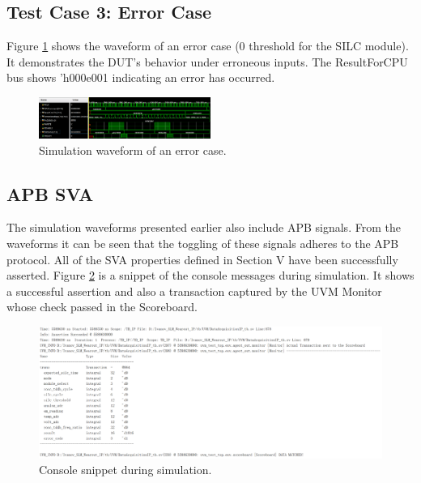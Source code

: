 \documentclass[conference]{IEEEtran}
\begin{document}
\subsection{Test Case 3: Error Case}
Figure \ref{fig:error} shows the waveform of an error case (0 threshold for the SILC module). It demonstrates the DUT's behavior under erroneous inputs. The ResultForCPU bus shows 'h000e001 indicating an error has occurred.
\begin{figure}[h!]
    \centering
    \includegraphics[width = 0.5\textwidth]{figures/error.png}
    \caption{Simulation waveform of an error case.}
    \label{fig:error}
\end{figure}

\subsection{APB SVA}
The simulation waveforms presented earlier also include APB signals. From the waveforms it can be seen that the toggling of these signals adheres to the APB protocol. All of the SVA properties defined in Section V have been successfully asserted. Figure \ref{fig:sva} is a snippet of the console messages during simulation. It shows a successful assertion and also a transaction captured by the UVM Monitor whose check passed in the Scoreboard.
\begin{figure}[h!]
    \centering
    \includegraphics[width = \textwidth]{figures/sva.png}
    \caption{Console snippet during simulation.}
    \label{fig:sva}
\end{figure}
\end{document}
